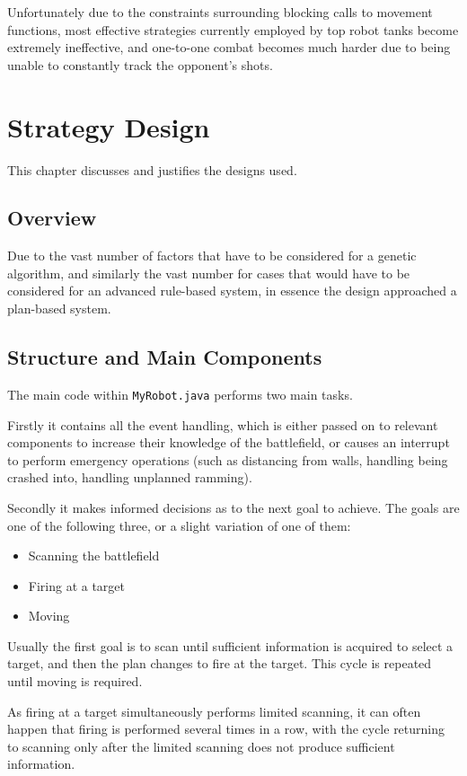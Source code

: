 \documentclass[11pt]{report}
\begin{document}
Unfortunately due to the constraints surrounding blocking calls to movement functions, most effective strategies currently employed by top robot tanks become extremely ineffective, and one-to-one combat becomes much harder due to being unable to constantly track the opponent's shots.


\chapter{Strategy Design} %
This chapter discusses and justifies the designs used.

\section{Overview}
Due to the vast number of factors that have to be considered for a genetic algorithm, and similarly the vast number for cases that would have to be considered for an advanced rule-based system, in essence the design approached a plan-based system.

\section{Structure and Main Components}
The main code within \texttt{MyRobot.java} performs two main tasks.

Firstly it contains all the event handling, which is either passed on to relevant components to increase their knowledge of the battlefield, or causes an interrupt to perform emergency operations (such as distancing from walls, handling being crashed into, handling unplanned ramming).

Secondly it makes informed decisions as to the next goal to achieve. The goals are one of the following three, or a slight variation of one of them:
\begin{itemize}
	\item Scanning the battlefield
	\item Firing at a target
	\item Moving
\end{itemize}

Usually the first goal is to scan until sufficient information is acquired to select a target, and then the plan changes to fire at the target. This cycle is repeated until moving is required.

As firing at a target simultaneously performs limited scanning, it can often happen that firing is performed several times in a row, with the cycle returning to scanning only after the limited scanning does not produce sufficient information.
\end{document}
